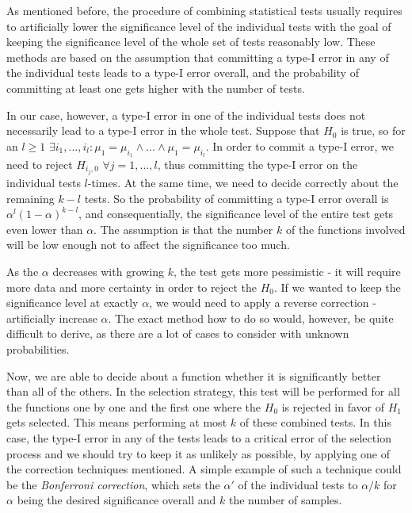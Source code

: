 As mentioned before, the procedure of combining statistical tests usually requires to artificially lower the significance level of the individual tests with the goal of keeping the significance level of the whole set of tests reasonably low. These methods are based on the assumption that committing a type-I error in any of the individual tests leads to a type-I error overall, and the probability of committing at least one gets higher with the number of tests.

In our case, however, a type-I error in one of the individual tests does not necessarily lead to a type-I error in the whole test. Suppose that $H_0$ is true, so for an $l \geq 1$ $\exists i_1,...,i_l: \mu_1 = \mu_{i_1} \wedge ... \wedge \mu_1 = \mu_{i_l}$. In order to commit a type-I error, we need to reject $H_{i_j,0}$ $\forall j = 1, ..., l$, thus committing the type-I error on the individual tests $l$-times. At the same time, we need to decide correctly about the remaining $k-l$ tests. So the probability of committing a type-I error overall is $\alpha^l(1-\alpha)^{k-l}$, and consequentially, the significance level of the entire test gets even lower than $\alpha$. The assumption is that the number $k$ of the functions involved will be low enough not to affect the significance too much. 

As the $\alpha$ decreases with growing $k$, the test gets more pessimistic - it will require more data and more certainty in order to reject the $H_0$. If we wanted to keep the significance level at exactly $\alpha$, we would need to apply a reverse correction - artificially increase $\alpha$. The exact method how to do so would, however, be quite difficult to derive, as there are a lot of cases to consider with unknown probabilities. 

Now, we are able to decide about a function whether it is significantly better than all of the others. In the selection strategy, this test will be performed for all the functions one by one and the first one where the $H_0$ is rejected in favor of $H_1$ gets selected. This means performing at most $k$ of these combined tests. In this case, the type-I error in any of the tests leads to a critical error of the selection process and we should try to keep it as unlikely as possible, by applying one of the correction techniques mentioned. A simple example of such a technique could be the \textit{Bonferroni correction}, which sets the $\alpha'$ of the individual tests to $\alpha / k$ for $\alpha$ being the desired significance overall and $k$ the number of samples.

